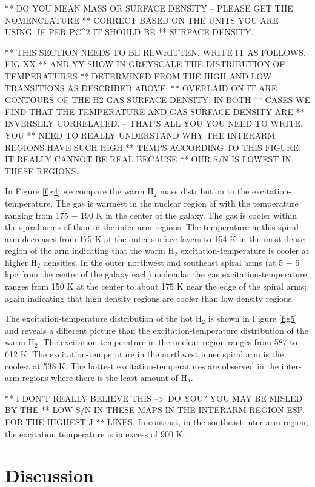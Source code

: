 \documentclass[manuscript]{aastex}
\begin{document}
** DO YOU MEAN MASS OR SURFACE DENSITY -- PLEASE GET THE NOMENCLATURE
** CORRECT BASED ON THE UNITS YOU ARE USING.  IF PER PC^2 IT SHOULD BE
** SURFACE DENSITY.


** THIS SECTION NEEDS TO BE REWRITTEN.  WRITE IT AS FOLLOWS.  FIG XX
** AND YY SHOW IN GREYSCALE THE DISTRIBUTION OF TEMPERATURES
** DETERMINED FROM THE HIGH AND LOW TRANSITIONS AS DESCRIBED ABOVE.
** OVERLAID ON IT ARE CONTOURS OF THE H2 GAS SURFACE DENSITY.  IN BOTH
** CASES WE FIND THAT THE TEMPERATURE AND GAS SURFACE DENSITY ARE
** INVERSELY CORRELATED. -- THAT'S ALL YOU YOU NEED TO WRITE.  YOU
** NEED TO REALLY UNDERSTAND WHY THE INTERARM REGIONS HAVE SUCH HIGH
** TEMPS ACCORDING TO THIS FIGURE.  IT REALLY CANNOT BE REAL BECAUSE
** OUR S/N IS LOWEST IN THESE REGIONS.

In Figure \ref{fig4} we compare the warm $\mathrm{H_2}$ mass
distribution to the excitation-temperature.  The gas is warmest in the
nuclear region of  with the temperature ranging from
175 $-$ 190 K in the center of the galaxy.  The gas is cooler within
the spiral arms of  than in the inter-arm regions.
The temperature in this spiral arm decreases from 175 K at the outer
surface layers to 154 K in the most dense region of the arm indicating
that the warm $\mathrm{H_2}$ excitation-temperature is cooler at
higher $\mathrm{H_2}$ densities.  In the outer northwest and southeast
spiral arms (at 5 $-$ 6 kpc from the center of the galaxy each)
molecular the gas excitation-temperature ranges from 150 K at the
center to about 175 K near the edge of the spiral arms; again
indicating that high density regions are cooler than low density
regions.

The excitation-temperature distribution of the hot $\mathrm{H_2}$ is
shown in Figure \ref{fig5} and reveals a different picture than the
excitation-temperature distribution of the warm $\mathrm{H_2}$.  The
excitation-temperature in the nuclear region ranges from 587 to 612 K.
The excitation-temperature in the northwest inner spiral arm is the
coolest at 538 K.  The hottest excitation-temperatures are observed in
the inter-arm regions where there is the least amount of
$\mathrm{H_2}$.  

** I DON'T REALLY BELIEVE THIS --> DO YOU?  YOU MAY BE MISLED BY THE
** LOW S/N IN THESE MAPS IN THE INTERARM REGION ESP. FOR THE HIGHEST J
** LINES.
In contrast, in the southeast inter-arm region, the
excitation temperature is in excess of 900 K.

\section{Discussion}
\end{document}
